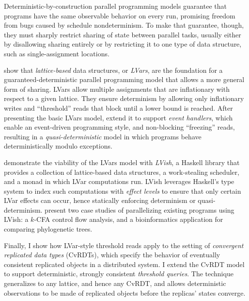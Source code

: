 Deterministic-by-construction parallel programming models guarantee
that programs have the same observable behavior on every run,
promising freedom from bugs caused by schedule nondeterminism.  To
make that guarantee, though, they must sharply restrict sharing of
state between parallel tasks, usually either by disallowing sharing
entirely or by restricting it to one type of data structure, such as
single-assignment locations.

 show that \emph{lattice-based} data structures, or \emph{LVars}, are the
foundation for a guaranteed-deterministic parallel programming model
that allows a more general form of sharing.  LVars allow multiple
assignments that are inflationary with respect to a given lattice.  They ensure determinism by allowing
only inflationary writes and ``threshold'' reads that block until a
lower bound is reached.  After presenting the basic LVars model, 
extend it to support \emph{event handlers}, which enable an event-driven
programming style, and non-blocking ``freezing'' reads, resulting in a
\emph{quasi-deterministic} model in which programs behave deterministically
modulo exceptions.

 demonstrate the viability of the LVars model with \emph{LVish}, a Haskell
library that provides a collection of lattice-based data structures, a
work-stealing scheduler, and a monad in which LVar computations run.
LVish leverages Haskell's type system to index such computations with
\emph{effect levels} to ensure that only certain LVar effects can occur,
hence statically enforcing determinism or quasi-determinism.  present
two case studies of parallelizing existing programs using LVish: a
$k$-CFA control flow analysis, and a bioinformatics application for
comparing phylogenetic trees.

\ifdefined\DISSERTATION
Finally, I show how LVar-style threshold reads apply to the setting of
\emph{convergent replicated data types} (CvRDTs), which specify the behavior
of eventually consistent replicated objects in a distributed system.
I extend the CvRDT model to support deterministic, strongly consistent
\emph{threshold queries}.  The technique generalizes to any lattice, and
hence any CvRDT, and allows deterministic observations to be made of
replicated objects before the replicas' states converge.
\fi
